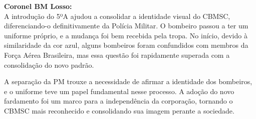 \noindent \textbf{Coronel BM Losso:} \\ A introdução do 5ºA ajudou a consolidar a identidade visual do CBMSC, diferenciando-o
definitivamente da Polícia Militar. O bombeiro passou a ter um uniforme próprio, e a mudança
foi bem recebida pela tropa. No início, devido à similaridade da cor azul, alguns bombeiros
foram confundidos com membros da Força Aérea Brasileira, mas essa questão foi rapidamente
superada com a consolidação do novo padrão.

\noindent A separação da PM trouxe a necessidade de afirmar a identidade dos bombeiros, e o uniforme
teve um papel fundamental nesse processo. A adoção do novo fardamento foi um marco para a
independência da corporação, tornando o CBMSC mais reconhecido e consolidando sua
imagem perante a sociedade.


